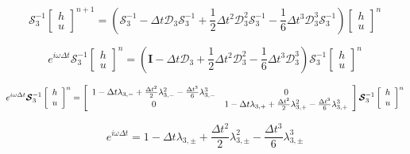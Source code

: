 \documentclass[12pt]{article}
\begin{document}
\[\boldsymbol{\mathcal{S}}_3^{-1}\left[\begin{array}{c}
h \\ u
\end{array}\right]^{n+1} = \left(\boldsymbol{\mathcal{S}}_3^{-1} -  \Delta t \boldsymbol{\mathcal{D}}_3 \boldsymbol{\mathcal{S}}_3^{-1}   + \frac{1}{2}\Delta t^2 \boldsymbol{\mathcal{D}}_3^2 \boldsymbol{\mathcal{S}}_3^{-1}- \frac{1}{6}\Delta t^3 \boldsymbol{\mathcal{D}}_3^3 \boldsymbol{\mathcal{S}}_3^{-1} \right) \left[\begin{array}{c}
h \\ u
\end{array}\right]^n\]

\[e^{i\omega \Delta t}\boldsymbol{\mathcal{S}}_3^{-1}\left[\begin{array}{c}
h \\ u
\end{array}\right]^{n} = \left(\boldsymbol{I} -  \Delta t \boldsymbol{\mathcal{D}}_3   + \frac{1}{2}\Delta t^2 \boldsymbol{\mathcal{D}}_3^2- \frac{1}{6}\Delta t^3 \boldsymbol{\mathcal{D}}_3^3 \right) \boldsymbol{\mathcal{S}}_3^{-1}\left[\begin{array}{c}
h \\ u
\end{array}\right]^n\]

\[e^{i\omega \Delta t}\boldsymbol{\mathcal{S}}_3^{-1}\left[\begin{array}{c}
h \\ u
\end{array}\right]^{n} = \left[\begin{array}{c c}
1 - \Delta t \lambda_{3,-} + \frac{\Delta t^2}{2} \lambda_{3,-}^2 - \frac{\Delta t^3}{6} \lambda_{3,-}^3  & 0 \\0  & 1 - \Delta t \lambda_{3,+} + \frac{\Delta t^2}{2} \lambda_{3,+}^2 - \frac{\Delta t^3}{6} \lambda_{3,+}^3
\end{array}\right] \boldsymbol{\mathcal{S}}_3^{-1}\left[\begin{array}{c}
h \\ u
\end{array}\right]^n\]

\[e^{i\omega\Delta t} = 1 - \Delta t \lambda_{3,\pm} + \frac{\Delta t^2}{2} \lambda_{3,\pm}^2 - \frac{\Delta t^3}{6} \lambda_{3,\pm}^3 \]
\end{document}

